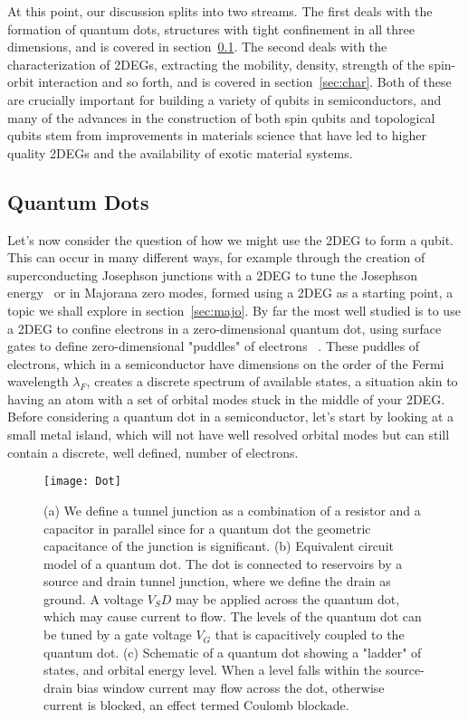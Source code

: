 At this point, our discussion splits into two streams.
The first deals with the formation of quantum dots, structures with tight confinement in all three dimensions,
and is covered in section~\ref{sec:qd}.
The second deals with the characterization of 2DEGs, extracting
the mobility, density, strength of the spin-orbit interaction and so forth, and is covered in section~\ref{sec:char}.
Both of these are crucially important for building a variety of qubits in semiconductors,
and many of the advances in the construction of both spin qubits and topological qubits stem from improvements in materials science that have led to higher quality 2DEGs and the availability of exotic material systems.

\subsection{Quantum Dots}
\label{sec:qd}
Let's now consider the question of how we might use the 2DEG to form a qubit. This can occur in many different
ways, for example through the creation of superconducting Josephson junctions with a 2DEG to tune the Josephson
energy~\cite{karl-gatemon} or in Majorana zero modes\cite{PhysRevLett.119.136803}, formed using a 2DEG as a starting
point, a topic we shall explore in section~\ref{sec:majo}. By far the most well studied is to use a 2DEG to confine
electrons in a zero-dimensional quantum dot, using surface gates to define zero-dimensional "puddles" of electrons
~\cite{RevModPhys.79.1217,RevModPhys.75.1}.
These puddles of electrons, which in a semiconductor have dimensions on the order of the Fermi wavelength $\lambda_F$,
creates a discrete spectrum of available states, a situation akin to having an atom with a set of orbital modes
stuck in the middle of your 2DEG\cite{PhysRevLett.77.3613}. Before considering a quantum dot in a semiconductor, let's
start by looking at a small metal island, which will not have well resolved orbital modes but can still contain a discrete, well defined, number of electrons.

\begin{figure}
  \texttt{[image: Dot]}
  \caption[Schematic of a Single Quantum Dot]
  {\label{fig:QD}(a) We define a tunnel junction as a combination of a resistor and a capacitor in parallel
  since for a quantum dot the geometric capacitance of the junction is significant. (b) Equivalent circuit
  model of a quantum dot. The dot is connected to reservoirs by a source and drain tunnel junction, where
  we define the drain as ground. A voltage $V_SD$ may be applied across the quantum dot, which may cause current
  to flow. The levels of the quantum dot can be tuned by a gate voltage $V_G$ that is capacitively coupled to the
  quantum dot. (c) Schematic of a quantum dot showing a "ladder" of states, and orbital energy level. When a level
  falls within the source-drain bias window current may flow across the dot, otherwise current is blocked, an
  effect termed Coulomb blockade.}
\end{figure}

